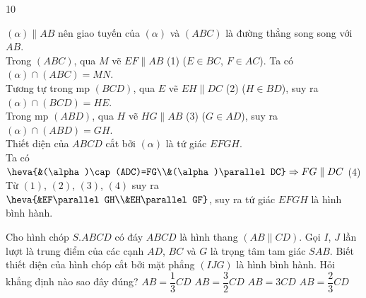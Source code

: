 \begin{indapan}{10}
\begin{ex}
{\begin{center}
        \end{center}
        $(\alpha) \parallel AB$ nên giao tuyến của $(\alpha)$ và $(ABC)$ là đường thẳng song song với $AB$.\\
        Trong $(ABC)$, qua $M$ vẽ $EF \parallel A B$ (1) \quad ($E \in BC$, $F \in AC$). Ta có $(\alpha) \cap (ABC)=M N$.\\
        Tương tự trong mp $(BCD)$, qua $E$ vẽ $EH \parallel DC$ (2) \quad  ($H \in B D$), suy ra $(\alpha) \cap (BCD)=HE$.\\
        Trong mp $(ABD)$, qua $H$ vẽ $HG \parallel AB$ (3) \quad  ($G \in A D$), suy ra $(\alpha) \cap (ABD)=GH$.\\
        Thiết diện của $ABCD$ cắt bởi $(\alpha)$ là tứ giác $EFGH$.\\
        Ta có $\heva{&(\alpha)\cap (ADC)=FG\\&(\alpha)\parallel DC}\Rightarrow FG\parallel DC$ \hfill (4)\\
        Từ $(1)$, $(2)$, $(3)$, $(4)$ suy ra $\heva{&EF\parallel GH\\&EH\parallel GF}$, suy ra tứ giác $EFGH$ là hình bình hành.
    }
\end{ex}
\begin{ex}%
    Cho hình chóp $S. ABCD$ có đáy $ABCD$ là hình thang $(AB \parallel CD)$. Gọi $I$, $J$ lần lượt là trung điểm của các cạnh $AD$, $BC$ và $G$ là trọng tâm tam giác $SAB$. Biết thiết diện của hình chóp cắt bởi mặt phẳng $(IJG)$ là hình bình hành. Hỏi khẳng định nào sao đây đúng?
    \choice
    {$A B=\dfrac{1}{3} C D$}
    {$A B=\dfrac{3}{2} C D$}
    {\True $A B=3 C D$}
    {$A B=\dfrac{2}{3} C D$}

\end{ex}
\end{indapan}

